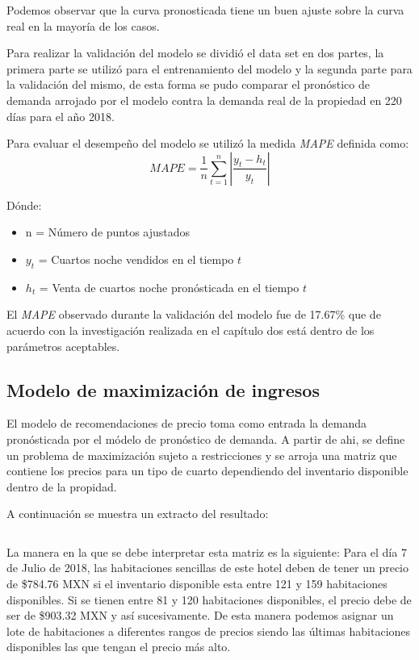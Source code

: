 Podemos observar que la curva pronosticada tiene un buen ajuste sobre la curva real en la mayoría de los casos.

Para realizar la validación del modelo se dividió el data set en dos partes, la primera parte se utilizó para el entrenamiento del modelo y la segunda parte para la validación del mismo, de esta forma se pudo comparar el pronóstico de demanda arrojado por el modelo contra la demanda real de la propiedad en 220 días para el año 2018.

Para evaluar el desempeño del modelo se utilizó la medida \emph{MAPE} definida como: $$MAPE=\frac{1}{n}\sum_{t=1}^{n}|\frac{y_t-h_t}{y_t}|$$

Dónde:
\begin{itemize}[noitemsep]
  \item n = Número de puntos ajustados
  \item $y_t$ = Cuartos noche vendidos en el tiempo $t$
  \item $h_t$ = Venta de cuartos noche pronósticada en el tiempo $t$
\end{itemize}


El \emph{MAPE} observado durante la validación del modelo fue de 17.67\% que de acuerdo con la investigación realizada en el capítulo dos está dentro de los parámetros aceptables.


\subsection*{Modelo de maximización de ingresos}

El modelo de recomendaciones de precio toma como entrada la demanda pronósticada por el módelo de pronóstico de demanda. A partir de ahi, se define un problema de maximización sujeto a restricciones y se arroja una matriz que contiene los precios para un tipo de cuarto dependiendo del inventario disponible dentro de la propidad.

A continuación se muestra un extracto del resultado:

{\centering
{}\par

}
\begin{verbatim}

\end{verbatim}


La manera en la que se debe interpretar esta matriz es la siguiente: Para el día 7 de Julio de 2018, las habitaciones sencillas de este hotel deben de tener un precio de \$784.76 MXN si el inventario disponible esta entre 121 y 159 habitaciones disponibles. Si se tienen entre 81 y 120 habitaciones disponibles, el precio debe de ser de \$903.32 MXN y así sucesivamente. De esta manera podemos asignar un lote de habitaciones a diferentes rangos de precios siendo las últimas habitaciones disponibles las que tengan el precio más alto.


